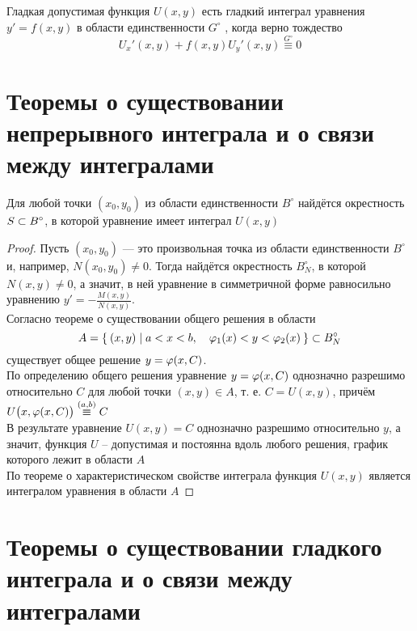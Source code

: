 \begin{implication}
    Гладкая допустимая функция $ U(x, y) $ есть гладкий интеграл уравнения  $ y' = f(x, y) $ в области единственности $ G^\circ $ , когда верно тождество
    $$ U_x'(x, y) + f(x, y)U_y'(x, y) \overset{G^\circ}\equiv 0 $$
\end{implication}

\section{Теоремы о существовании непрерывного интеграла и о связи между интегралами}

\begin{theorem}
    Для любой точки $ (x_0, y_0) $ из области единственности $ B^\circ $ найдётся окрестность $ S \subset B^\circ $, в которой уравнение  имеет интеграл $ U(x, y) $
\end{theorem}

\begin{proof}
    Пусть $ (x_0, y_0) $ --- это произвольная точка из области единственности $ B^\circ $ и, например, $ N(x_0, y_0) \ne 0 $. Тогда найдётся окрестность $ B_N^\circ $, в которой $ N(x, y) \ne 0 $, а значит, в ней уравнение в симметричной форме  равносильно уравнению $ y' = - \frac{M(x, y)}{N(x, y)} $. \\
    Согласно теореме о существовании общего решения в области
    $$ A = \Set{(x,y) | a < x < b, \quad \varphi_1(x) < y < \varphi_2(x)} \subset B_N^\circ $$
    существует общее решение $ y = \varphi(x, C) $. \\
    По определению общего решения уравнение $ y = \varphi(x, C) $ однозначно разрешимо относительно $ C $ для любой точки $ (x, y) \in A $, т. е. $ C = U(x, y) $, причём $ U \big( x, \vphi(x, C) \big) \overset{(a, b)}\equiv C $ \\
    В результате уравнение $ U(x, y) = C $ однозначно разрешимо относительно $ y $, а значит, функция $ U $ -- допустимая и постоянна вдоль любого решения, график которого лежит в области $ A $ \\
    По теореме о характеристическом свойстве интеграла функция $ U(x, y) $ является интегралом уравнения  в области $ A $
\end{proof}

\section{Теоремы о существовании гладкого интеграла и о связи между интегралами}

